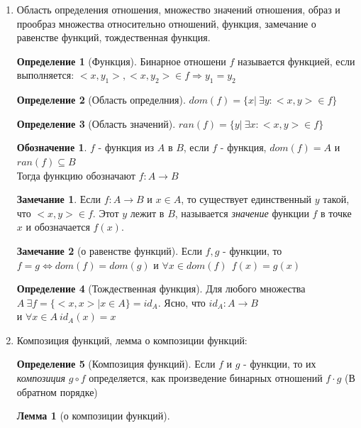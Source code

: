 \documentclass[a4paper]{article}
\newtheorem*{lemma*}{Лемма}
\theoremstyle{definition}
\newtheorem*{definition*}{Определение}
\newtheorem*{name}{Обозначение}
\newtheorem*{comment*}{Замечание}
\begin{document}
\begin{enumerate}
 \item Область определения отношения, множество значений отношения, образ и прообраз множества
       относительно отношений, функция, замечание о равенстве функций, тождественная функция.
       \begin{definition*}[Функция]
        Бинарное отношени $f$ называется функцией, если выполняется: $<x,y_1>, <x, y_2> \in f \Rightarrow y_1 = y_2$
       \end{definition*}
       \begin{definition*}[Область определния]
        $dom(f) = \{x|\ \exists{y} : <x,y>\in f\}$
       \end{definition*}
       \begin{definition*}[Область значений]
        $ran(f) =\{y|\ \exists{x} : <x,y>\in f\} $
       \end{definition*}
       \begin{name}
        $f$ - функция из $A$ в $B$, если
        $f$ - функция, $dom(f)=A$ и $ran(f) \subseteq{B}$\\
        Тогда функцию обозначают $f: A\rightarrow{B}$
       \end{name}
       \begin{comment*}
        Если $f:A\rightarrow{B}$ и $x\in{A}$, то существует единственный $y$ такой, что $<x,y>\in{f}$. Этот $y$ лежит в $B$, называется \textit{значение} функции $f$ в точке $x$ и обозначается $f(x)$.
       \end{comment*}
       \begin{comment*}[о равенстве функций]
        Если $f,g$ - функции, то $f = g \Leftrightarrow dom(f)=dom(g)$ и $\forall{x}\in{dom(f)} \ \ f(x)=g(x)$
       \end{comment*}
       \begin{definition*}[Тождественная функция]
        Для любого множества \\$A \ \exists{f} = \{<x,x>| x\in{A}\} = id_{A}$.
         Ясно, что $id_{A}:A\rightarrow{B}$\\ и $\forall{x}\in{A} \ id_{A}(x) = x$
       \end{definition*}
 \item Композиция функций, лемма о композиции функций:
       \begin{definition*}[Композиция функций]
        Если $f$ и $g$ - функции, то их \textit{композиция} $g\circ{f}$ определяется, как произведение бинарных отношений $f\cdot{g}$ (В обратном порядке)
       \end{definition*}
       \begin{lemma*}[о композиции функций]

\end{lemma*}
\end{enumerate}
\end{document}
